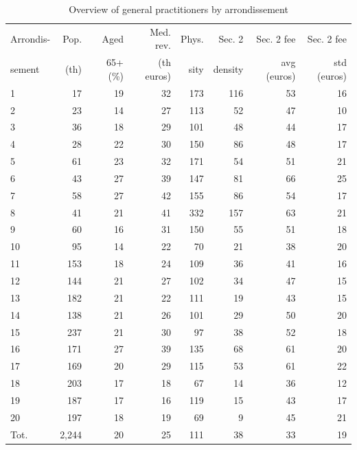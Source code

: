 \documentclass[11pt]{article}
\begin{document}
\begin{table}[h]
\caption{Overview of general practitioners by arrondissement}
\label{tab:GP_stats_des}
\begin{tabular}{lrrrrrrr}
\hline
\hline
Arrondis-      & Pop.      & Aged       & Med. rev.  & Phys.  & Sec. 2  & Sec. 2 fee  & Sec. 2 fee  \\
sement         & (th)      & 65+ (\%)   & (th euros) & sity   & density & avg (euros) & std (euros) \\
\hline
1     & 17    & 19    & 32    & 173   & 116   & 53    & 16 \\
2     & 23    & 14    & 27    & 113   & 52    & 47    & 10 \\
3     & 36    & 18    & 29    & 101   & 48    & 44    & 17 \\
4     & 28    & 22    & 30    & 150   & 86    & 48    & 17 \\
5     & 61    & 23    & 32    & 171   & 54    & 51    & 21 \\
6     & 43    & 27    & 39    & 147   & 81    & 66    & 25 \\
7     & 58    & 27    & 42    & 155   & 86    & 54    & 17 \\
8     & 41    & 21    & 41    & 332   & 157   & 63    & 21 \\
9     & 60    & 16    & 31    & 150   & 55    & 51    & 18 \\
10    & 95    & 14    & 22    & 70    & 21    & 38    & 20 \\
11    & 153   & 18    & 24    & 109   & 36    & 41    & 16 \\
12    & 144   & 21    & 27    & 102   & 34    & 47    & 15 \\
13    & 182   & 21    & 22    & 111   & 19    & 43    & 15 \\
14    & 138   & 21    & 26    & 101   & 29    & 50    & 20 \\
15    & 237   & 21    & 30    & 97    & 38    & 52    & 18 \\
16    & 171   & 27    & 39    & 135   & 68    & 61    & 20 \\
17    & 169   & 20    & 29    & 115   & 53    & 61    & 22 \\
18    & 203   & 17    & 18    & 67    & 14    & 36    & 12 \\
19    & 187   & 17    & 16    & 119   & 15    & 43    & 17 \\
20    & 197   & 18    & 19    & 69    & 9     & 45    & 21 \\
\hline
Tot. & 2,244  & 20    & 25    & 111   & 38    & 33    & 19 \\
\hline
\hline
\end{tabular}%
\end{table}
\end{document}
